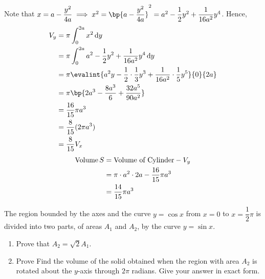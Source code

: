 \documentclass{echw}
\begin{document}

        Note that $x = a-\dfrac{y^2}{4a} \implies x^2 = \bp{a - \dfrac{y^2}{4a}}^2 = a^2 - \dfrac12 y^2 + \dfrac1{16a^2}y^4$. Hence, 
        {\allowdisplaybreaks
        \begin{align*}
            V_y &= \pi \int_0^{2a} x^2 \d y\\
            &= \pi \int_0^{2a} a^2 - \dfrac12 y^2 + \dfrac1{16a^2}y^4 \d y\\
            &= \pi \evalint{a^2y - \dfrac12 \cdot \dfrac13 y^3 + \dfrac1{16a^2}\cdot \dfrac15 y^5}{0}{2a}\\
            &= \pi \bp{2a^3 - \dfrac{8a^3}6 + \dfrac{32a^5}{90a^2}}\\
            &= \dfrac{16}{15} \pi a^3\\
            &= \dfrac8{15} (2\pi a^3)\\
            &= \dfrac8{15} V_x
        \end{align*}}
        \begin{align*}
            \operatorname{Volume} S &= \text{Volume of Cylinder} - V_y\\
            &= \pi \cdot a^2 \cdot 2a - \dfrac{16}{15} \pi a^3\\
            &= \dfrac{14}{15} \pi a^3
        \end{align*}
        

    \problem{}
        The region bounded by the axes and the curve $y = \cos x$ from $x = 0$ to $x = \dfrac12 \pi$ is divided into two parts, of areas $A_1$ and $A_2$, by the curve $y = \sin x$.

        \begin{enumerate}
            \item Prove that $A_2 = \sqrt2 A_1$.
            \item Prove Find the volume of the solid obtained when the region with area $A_2$ is rotated about the $y$-axis through $2\pi$ radians. Give your answer in exact form.
        \end{enumerate}
\end{document}
